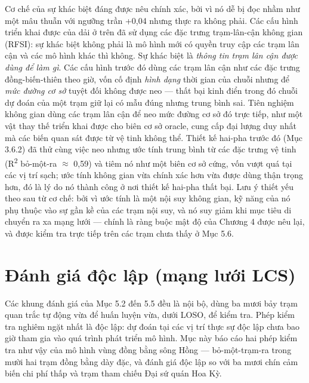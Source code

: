 Cơ chế của sự khác biệt đáng được nêu chính xác, bởi vì nó dễ bị đọc nhầm như một mâu thuẫn với ngưỡng trần +0,04 nhưng thực ra không phải. Các cấu hình triển khai được của dải ở trên đã sử dụng các đặc trưng trạm-lân-cận không gian (RFSI): sự khác biệt không phải là mô hình mới có quyền truy cập các trạm lân cận và các mô hình khác thì không. Sự khác biệt là \emph{thông tin trạm lân cận được dùng để làm gì}. Các cấu hình trước đó dùng các trạm lân cận như các đặc trưng đồng-biến-thiên theo giờ, vốn cố định \emph{hình dạng} thời gian của chuỗi nhưng để \emph{mức đường cơ sở} tuyệt đối không được neo --- thất bại kinh điển trong đó chuỗi dự đoán của một trạm giữ lại có mẫu đúng nhưng trung bình sai. Tiên nghiệm không gian dùng các trạm lân cận để neo mức đường cơ sở đó trực tiếp, như một vật thay thế triển khai được cho biên cơ sở oracle, cung cấp đại lượng duy nhất mà các biến quan sát được từ vệ tinh không thể. Thiết kế hai-pha trước đó (Mục 3.6.2) đã thử cùng việc neo nhưng ước tính trung bình từ các đặc trưng vệ tinh (R\textsuperscript{2} bỏ-một-ra $\approx$ 0,59) và tiêm nó như một biên cơ sở cứng, vốn vượt quá tại các vị trí sạch; ước tính không gian vừa chính xác hơn vừa được dùng thận trọng hơn, đó là lý do nó thành công ở nơi thiết kế hai-pha thất bại. Lưu ý thiết yếu theo sau từ cơ chế: bởi vì ước tính là một nội suy không gian, kỹ năng của nó phụ thuộc vào sự gần kề của các trạm nội suy, và nó suy giảm khi mục tiêu di chuyển ra xa mạng lưới --- chính là ràng buộc mật độ của Chương 4 được nêu lại, và được kiểm tra trực tiếp trên các trạm chưa thấy ở Mục 5.6.


\section{Đánh giá độc lập (mạng lưới LCS)}

Các khung đánh giá của Mục 5.2 đến 5.5 đều là nội bộ, dùng ba mươi bảy trạm quan trắc tự động vừa để huấn luyện vừa, dưới LOSO, để kiểm tra. Phép kiểm tra nghiêm ngặt nhất là độc lập: dự đoán tại các vị trí thực sự độc lập chưa bao giờ tham gia vào quá trình phát triển mô hình. Mục này báo cáo hai phép kiểm tra như vậy của mô hình vùng đồng bằng sông Hồng --- bỏ-một-trạm-ra trong mười hai trạm đồng bằng dày đặc, và đánh giá độc lập so với ba mươi chín cảm biến chi phí thấp và trạm tham chiếu Đại sứ quán Hoa Kỳ.

